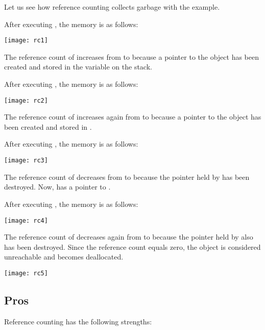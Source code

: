 Let us see how reference counting collects garbage with the example.

After executing , the memory is as follows:

\begin{center}
\texttt{[image: rc1]}
\end{center}

The reference count of  increases from  to 
because a pointer to the object has been created and stored in the variable
 on the stack.

After executing , the memory is as follows:

\begin{center}
\texttt{[image: rc2]}
\end{center}

The reference count of  increases again from  to 
because a pointer to the object has been created and stored in .

After executing , the memory is as follows:

\begin{center}
\texttt{[image: rc3]}
\end{center}

The reference count of  decreases from  to 
because the pointer held by  has been destroyed. Now,  has a
pointer to .

After executing , the memory is as follows:

\begin{center}
\texttt{[image: rc4]}
\end{center}

The reference count of  decreases again from  to 
because the pointer held by  also has been destroyed. Since the
reference count equals zero, the object is considered unreachable and becomes
deallocated.

\begin{center}
\texttt{[image: rc5]}
\end{center}

\subsection{Pros}

Reference counting has the following strengths:

